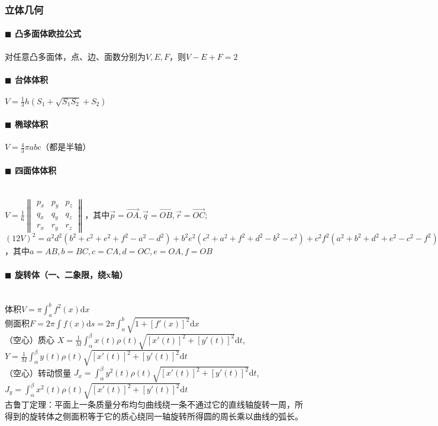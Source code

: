 \subsubsection{立体几何}
\paragraph{$\blacksquare$ 凸多面体欧拉公式}
对任意凸多面体，点、边、面数分别为$V, E, F$，则$V-E+F=2$
\paragraph{$\blacksquare$ 台体体积}
$V=\frac{1}{3}h(S_1+\sqrt {S_1S_2}+S_2)$
\paragraph{$\blacksquare$ 椭球体积}
$V=\frac{4}{3} \pi abc$（都是半轴）
\paragraph{$\blacksquare$ 四面体体积}
\noindent \\
$V=\frac{1}{6} \begin{Vmatrix} p_x & p_y & p_z\\ q_x & q_y & q_z\\ r_x & r_y & r_z \end{Vmatrix}$，其中$\vec p=\overrightarrow{OA}, \vec q=\overrightarrow{OB}, \vec r=\overrightarrow{OC}$;\\
$(12V)^2=a^2d^2(b^2+c^2+e^2+f^2-a^2-d^2)+b^2e^2(c^2+a^2+f^2+d^2-b^2-e^2)+c^2f^2(a^2+b^2+d^2+e^2-c^2-f^2)-a^2b^2c^2-a^2e^2f^2-d^2b^2f^2-d^2e^2c^2$，其中$a=AB,b=BC,c=CA,d=OC,e=OA,f=OB$
\paragraph{$\blacksquare$ 旋转体（一、二象限，绕x轴）}
\noindent \\
体积$V=\pi \int_{a}^{b} f^2(x) \mathrm{d} x$\\
侧面积$F=2\pi \int f(x) \mathrm{d} s=2\pi \int_{a}^{b} \sqrt{1+[f'(x)]^2} \mathrm{d} x$\\
（空心）质心
$X=\frac{1}{M} \int_{\alpha}^{\beta} x(t) \rho (t) \sqrt{[x'(t)]^2+[y'(t)]^2} \mathrm{d} t$,~
$Y=\frac{1}{M} \int_{\alpha}^{\beta} y(t) \rho (t) \sqrt{[x'(t)]^2+[y'(t)]^2} \mathrm{d} t$\\
（空心）转动惯量
$J_x=\int_{\alpha}^{\beta} y^2(t) \rho (t) \sqrt{[x'(t)]^2+[y'(t)]^2} \mathrm{d} t$,~
$J_y=\int_{\alpha}^{\beta} x^2(t) \rho (t) \sqrt{[x'(t)]^2+[y'(t)]^2} \mathrm{d} t$\\
古鲁丁定理：平面上一条质量分布均匀曲线绕一条不通过它的直线轴旋转一周，所得到的旋转体之侧面积等于它的质心绕同一轴旋转所得圆的周长乘以曲线的弧长。
